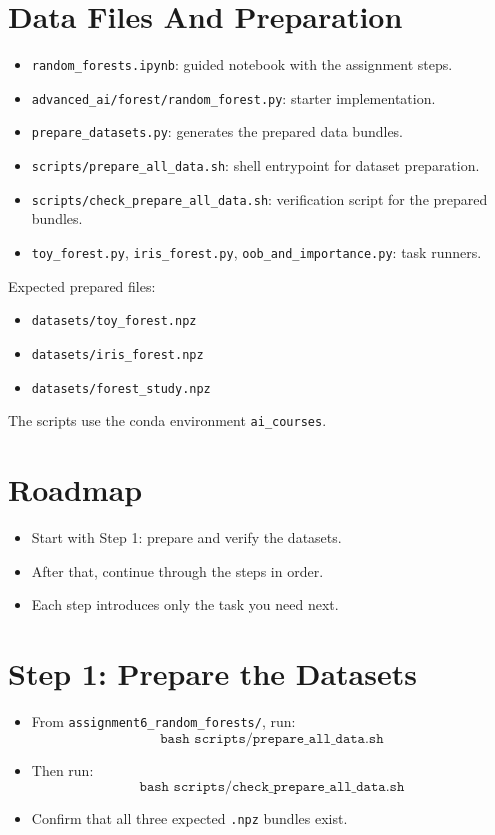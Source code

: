 \section*{Data Files And Preparation}
\begin{itemize}
  \item \texttt{random\_forests.ipynb}: guided notebook with the assignment steps.
  \item \texttt{advanced\_ai/forest/random\_forest.py}: starter implementation.
  \item \texttt{prepare\_datasets.py}: generates the prepared data bundles.
  \item \texttt{scripts/prepare\_all\_data.sh}: shell entrypoint for dataset preparation.
  \item \texttt{scripts/check\_prepare\_all\_data.sh}: verification script for the prepared bundles.
  \item \texttt{toy\_forest.py}, \texttt{iris\_forest.py}, \texttt{oob\_and\_importance.py}: task runners.
\end{itemize}

\medskip
Expected prepared files:
\begin{itemize}
  \item \texttt{datasets/toy\_forest.npz}
  \item \texttt{datasets/iris\_forest.npz}
  \item \texttt{datasets/forest\_study.npz}
\end{itemize}

\medskip
The scripts use the conda environment \texttt{ai\_courses}.

\section*{Roadmap}
\begin{itemize}
  \item Start with Step 1: prepare and verify the datasets.
  \item After that, continue through the steps in order.
  \item Each step introduces only the task you need next.
\end{itemize}

\section*{Step 1: Prepare the Datasets}
\begin{itemize}
  \item From \texttt{assignment6\_random\_forests/}, run:
  \[
    \texttt{bash scripts/prepare\_all\_data.sh}
  \]
  \item Then run:
  \[
    \texttt{bash scripts/check\_prepare\_all\_data.sh}
  \]
  \item Confirm that all three expected \texttt{.npz} bundles exist.
\end{itemize}

